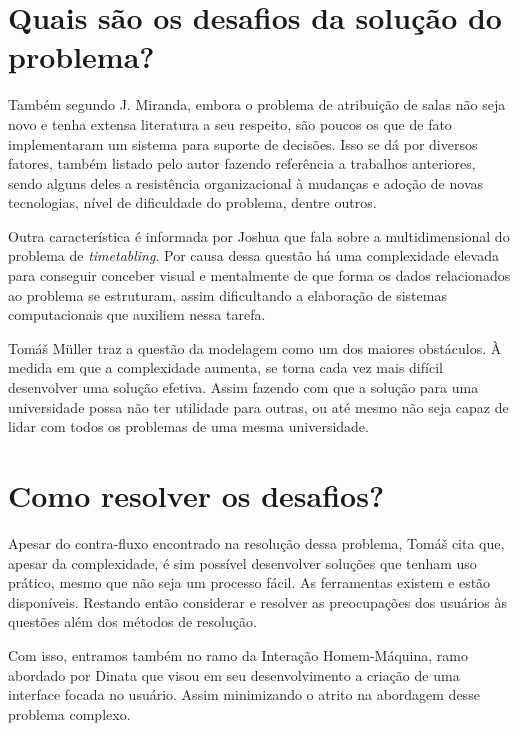 
\section{Quais são os desafios da solução do problema?}

Também segundo J. Miranda, embora o problema de atribuição de salas não seja novo e tenha extensa literatura a seu respeito, são poucos os que de fato implementaram um sistema para suporte de decisões. Isso se dá por diversos fatores, também listado pelo autor fazendo referência a trabalhos anteriores, sendo alguns deles a resistência organizacional à mudanças e adoção de novas tecnologias, nível de dificuldade do problema, dentre outros.


Outra característica é informada por Joshua \cite{THOMAS2009} que fala sobre a multidimensional do problema de \textit{timetabling}. Por causa dessa questão há uma complexidade elevada para conseguir conceber visual e mentalmente de que forma os dados relacionados ao problema se estruturam, assim dificultando a elaboração de sistemas computacionais que auxiliem nessa tarefa.

Tomáš Müller \cite{MURRAY2007} traz a questão da modelagem como um dos maiores obstáculos. À medida em que a complexidade aumenta, se torna cada vez mais difícil desenvolver uma solução efetiva. Assim fazendo com que a solução para uma universidade possa não ter utilidade para outras, ou até mesmo não seja capaz de lidar com todos os problemas de uma mesma universidade.

\section{Como resolver os desafios?}

Apesar do contra-fluxo encontrado na resolução dessa problema, Tomáš cita que, apesar da complexidade, é sim possível desenvolver soluções que tenham uso prático, mesmo que não seja um processo fácil. As ferramentas existem e estão disponíveis. Restando então considerar e resolver as preocupações dos usuários às questões além dos métodos de resolução.

Com isso, entramos também no ramo da Interação Homem-Máquina, ramo abordado por Dinata \cite{ANDRE2018} que visou em seu desenvolvimento a criação de uma interface focada no usuário. Assim minimizando o atrito na abordagem desse problema complexo.
